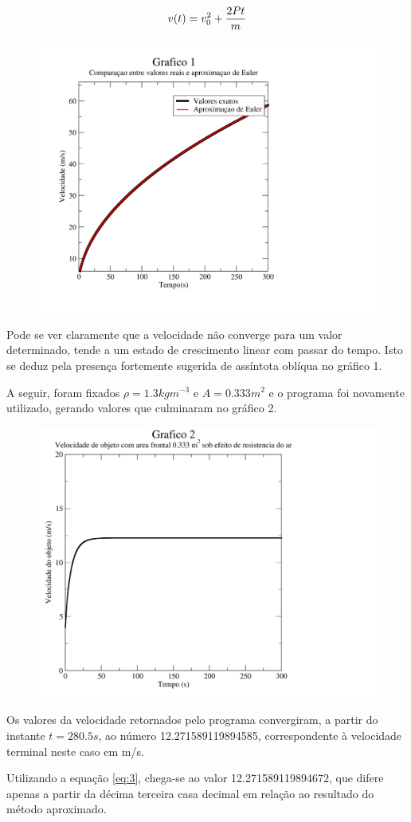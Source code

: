 \documentclass{article}
\begin{document}
\begin{equation}
  \label{eq:2}
  v(t) = v^2_0 + {2Pt \over m}
\end{equation}

\begin{figure}[h!]
  \centering
  \includegraphics[width=.64\textwidth]{graf1}
\end{figure}

Pode se ver claramente que a velocidade não converge para um valor determinado, tende a um estado de crescimento linear com passar do tempo. Isto se deduz pela presença fortemente sugerida de assíntota oblíqua no gráfico 1.

A seguir, foram fixados \(\rho = 1.3 kg m^{-3}\) e \(A= 0.333 m^2\) e o programa foi novamente utilizado, gerando valores que culminaram no gráfico 2.

\begin{figure}[h!]
  \centering
  \includegraphics[width=.64\textwidth]{graf2}
\end{figure}

Os valores da velocidade retornados pelo programa convergiram, a partir do instante \(t=280.5s\), ao número 12.271589119894585, correspondente à velocidade terminal neste caso em m/s.\par
Utilizando a equação \ref{eq:3}, chega-se ao valor 12.271589119894672, que difere apenas a partir da décima terceira casa decimal em relação ao resultado do método aproximado.
\end{document}
